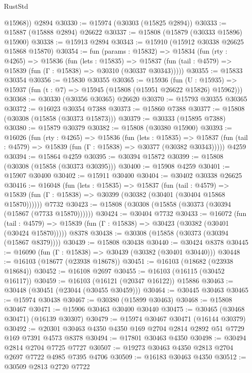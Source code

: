 \begin{lexlean}{RustStd}
\begin{coremodule}
        @15968))
    @2894
@30330 := @15974 (@30303 (@15825 @2894))
@30333 := @15887 (@15888 @2894) @26622
@30337 := @15808 (@15879 (@30333 @15896) @15900)
@30338 := @15913 @2894
@30343 := @15910 (@15912 @30338 @26625 @15868 @15870)
@30354 := fun (params : @15832) =>
  @15834
    (fun (rty : @4265) =>
    @15836
      (fun (lets : @15835) =>
      @15837 (fun (tail : @4579) => @15839 (fun (Γ : @15838) => @30310 (@30337 @30343)))))
@30355 := @15833 @30354
@30356 := @15830 @30355
@30365 := @15936
    (fun (U : @15935) => @15937 (fun (t : @7) => @15945 (@15808 (@15951 @26622 @15826) @15962)))
@30368 := @30330 (@30356 @30365) @26620
@30370 := @15793 @30355 @30365
@30372 := @16023 @30354 @7388
@30373 := @15860 @7388
@30377 := @15808 (@30308 (@15858 (@30373 @15873)))
@30379 := @30333 (@15895 @7388)
@30380 := @15879 @30379
@30382 := @15808 (@30380 @15900)
@30393 := @16026
    (fun (rty : @4265) =>
    @15836
      (fun (lets : @15835) =>
      @15837 (fun (tail : @4579) => @15839 (fun (Γ : @15838) => @30377 (@30382 @30343)))))
    @4259
@30394 := @15864 @4259
@30395 := @30394 @15872
@30399 := @15808 (@30308 (@15858 (@30373 @30395)))
@30400 := @15908 @4259
@30401 := @15907 @30400
@30402 := @15911 @30400
@30404 := @30402 @30338 @26625
@30416 := @16048
    (fun (lets : @15835) =>
    @15837
      (fun (tail : @4579) =>
      @15839 (fun (Γ : @15838) => @30399 (@30382 (@30401 (@30404 @15868 @15870))))))
    @7732
@30423 := @15808 (@30308 (@15858 (@30373 (@30394 (@15867 (@7733 @15870))))))
@30424 := @30404 @7732
@30433 := @16072
    (fun (tail : @4579) => @15839 (fun (Γ : @15838) => @30423 (@30382 (@30401 (@30424 @15870)))))
    @8378
@30438 := @30308 (@15858 (@30373 (@30394 (@15867 @8379))))
@30439 := @15808 @30438
@30440 := @30424 @8378
@30445 := @16090 (fun (Γ : @15838) => @30439 (@30382 (@30401 @30440)))
@30448 := @16103 (@18677 (@23938 @18678))
@30451 := @16103 (@18682 (@23938 @18684))
@30452 := @16108 @2697
@30455 := @16103 (@16115 (@30452 @16117))
@30459 := @16103 (@16121 (@20347 @16122)) @15886
@30463 := @30448 (@30451 (@23044 (@30455 @30459)))
@30464 := @30445 @30463
@30465 := @15974 @30438
@30467 := @30380 (@15899 @30463)
@30468 := @15808 @30467
@30471 := @15906 @30463 @30400 @30440
@30475 := @30465 (@30468 @30471) (@16139 @30307)
@30479 := @15974 @30467 @30471 (@16144 @30379)
@30492 := @20301 @30463 @4350 @4350 @169 @2704 @2814 @2892 @51 @7729 @169 @7391 @4573 @8378
@30494 := @17801 @30463 @4350
@30498 := @30494 @2814 @2704 @7725 @7727
@30507 := @19273 @30463 @4350 @2813 @2704 @2697 @7722 @4985 @7395 @4706
@30509 := @16183 @30463 @4350
@30512 := @30509 @2813 @2720 @7722

\end{coremodule}
\end{lexlean}

